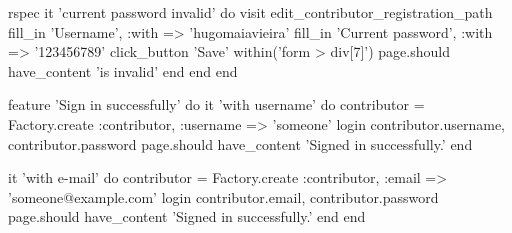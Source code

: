 \begin{mycode}{rspec}
    it 'current password invalid' do
      visit edit_contributor_registration_path
      fill_in 'Username', :with => 'hugomaiavieira'
      fill_in 'Current password', :with => '123456789'
      click_button 'Save'
      within('form > div[7]') { page.should have_content 'is invalid' }
    end
  end
end

feature 'Sign in successfully' do
  it 'with username' do
    contributor = Factory.create :contributor, :username => 'someone'
    login contributor.username, contributor.password
    page.should have_content 'Signed in successfully.'
  end

  it 'with e-mail' do
    contributor = Factory.create :contributor, :email => 'someone@example.com'
    login contributor.email, contributor.password
    page.should have_content 'Signed in successfully.'
  end
end
\end{mycode}

